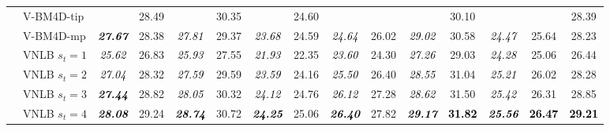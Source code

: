 \documentclass[10pt, journal, twocolumn, final, a4paper]{IEEEtran}
\newcommand{\bsic}[1]{\textcolor{black}{\textit{#1}}}
\newcommand{\Bsic}[1]{\textcolor{black}{\textbf{\textit{#1}}}}
\newcommand{\Best}[1]{\textbf{\textcolor{black}{#1}}}
\begin{document}
\begin{table}[htp!]
\begin{center}
{\begin{tabular}{ c | l |c c | c c | c c | c c | c c | c c | c }
			                      & V-BM4D-tip           & \bsic{     } &       28.49  & \bsic{     } &       30.35   & \bsic{     } &       24.60   &              &              &              &       30.10   &              &              &       28.39  \\
			                      & V-BM4D-mp            & \Bsic{27.67} &       28.38  & \bsic{27.81} &       29.37   & \bsic{23.68} &       24.59   & \bsic{24.64} &       26.02  & \bsic{29.02} &       30.58   & \bsic{24.47} &       25.64  &       28.23  \\
			                      & VNLB   $s_t = 1$     & \bsic{25.62} &       26.83  & \bsic{25.93} &       27.55   & \bsic{21.93} &       22.35   & \bsic{23.60} &       24.30  & \bsic{27.26} &       29.03   & \bsic{24.28} &       25.06  &       26.44  \\
			                      & VNLB   $s_t = 2$     & \bsic{27.04} &       28.32  & \bsic{27.59} &       29.59   & \bsic{23.59} &       24.16   & \bsic{25.50} &       26.40  & \bsic{28.55} &       31.04   & \bsic{25.21} &       26.02  &       28.28  \\
			                      & VNLB   $s_t = 3$     & \Bsic{27.44} &       28.82  & \bsic{28.05} &       30.32   & \bsic{24.12} &       24.76   & \bsic{26.12} &       27.28  & \bsic{28.62} &       31.50   & \bsic{25.42} &       26.31  &       28.85  \\
			                      & VNLB   $s_t = 4$     & \Bsic{28.08} &       29.24  & \Bsic{28.74} &       30.72   & \Bsic{24.25} &       25.06   & \Bsic{26.40} &       27.82  & \Bsic{29.17} & \Best{31.82}  & \Bsic{25.56} & \Best{26.47} & \Best{29.21} \\\hline

\end{tabular}}
\end{center}
\end{table}
\end{document}
